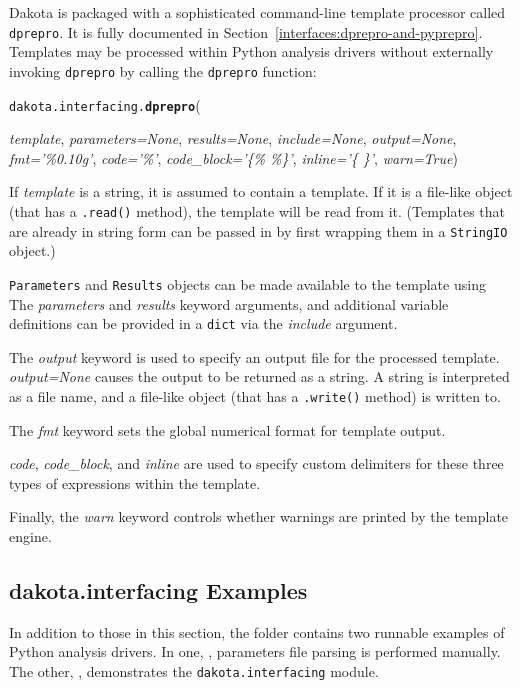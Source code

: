 Dakota is packaged with a sophisticated command-line template processor
called \texttt{dprepro}. It is fully documented in 
Section~\ref{interfaces:dprepro-and-pyprepro}. Templates may be processed 
within Python analysis drivers without externally invoking \texttt{dprepro} 
by calling the \texttt{dprepro} function:

\label{index:dakota.interfacing.dprepro}\texttt{dakota.interfacing.}\textbf{\texttt{dprepro}}({\emph{template}, \emph{parameters=None}, \emph{results=None}, \emph{include=None},
	\emph{output=None}, \emph{fmt='\%0.10g'}, \emph{code='\%'}, \emph{code\_block='\{\% \%\}'},
		\emph{inline='\{ \}'}, \emph{warn=True}){}

If \emph{template} is a string, it is assumed to contain a template. If it 
is a file-like object (that has a \texttt{.read()}
method), the template will be read from it. (Templates that are already in
string form can be passed in by first wrapping them in a \texttt{StringIO}
object.)

\texttt{Parameters} and \texttt{Results} objects can be made available to the
template using The \emph{parameters} and \emph{results} keyword arguments, and 
additional variable definitions can be provided in a \texttt{dict} via the
\emph{include} argument.

The \emph{output} keyword is used to specify an output file for the processed 
template. \emph{output=None} causes the output to be returned as a string. A
string is interpreted as a file name, and a file-like object (that has a 
\texttt{.write()} method) is written to.

The \emph{fmt} keyword sets the global numerical format for template output.

\emph{code}, \emph{code\_block}, and \emph{inline} are used to specify custom 
delimiters for these three types of expressions within the template.

Finally, the \emph{warn} keyword controls whether warnings are printed by the
template engine.

\subsection{dakota.interfacing Examples}

In addition to those in this section, the  folder contains two runnable examples of Python analysis drivers. In one, , parameters file parsing is performed manually. The other, , demonstrates the {\tt dakota.interfacing} module.

}
